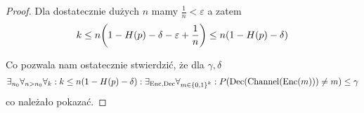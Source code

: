 \begin{proof}
	Dla dostatecznie dużych \( n \) mamy \( \frac{1}{n} < \varepsilon \) a zatem
	\[
		k \leq n \pars{1 - H(p) - \delta - \varepsilon + \frac{1}{n}} \leq n \pars{1 - H(p) - \delta}
	\]

	Co pozwala nam ostatecznie stwierdzić, że dla \( \gamma, \delta \)
	\begin{multline*}
		\exists_{n_0} \forall_{n > n_0}
		\forall_k : k \leq n \pars{1 - H(p) - \delta} :
		\exists_{\Enc, \Dec} \forall_{m \in \set{0, 1}^k} :
		P\pars{\Dec(\Channel(\Enc(m))) \neq m} \leq \gamma
	\end{multline*}
	co należało pokazać.
\end{proof}